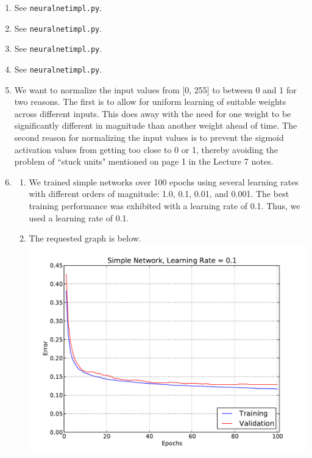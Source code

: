 \documentclass[solution, letterpaper]{cs121}
\begin{document}
\begin{enumerate}
	\item See {\tt neural\textunderscore net\textunderscore impl.py}.
	\item See {\tt neural\textunderscore net\textunderscore impl.py}.
	\item See {\tt neural\textunderscore net\textunderscore impl.py}.
	\item See {\tt neural\textunderscore net\textunderscore impl.py}.
	\item We want to normalize the input values from [0, 255] to between 0 and 1 for two reasons. The first is to allow for uniform learning of suitable weights across different inputs. This does away with the need for one weight to be significantly different in magnitude than another weight ahead of time. The second reason for normalizing the input values is to prevent the sigmoid activation values from getting too close to 0 or 1, thereby avoiding the problem of ``stuck units" mentioned on page 1 in the Lecture 7 notes.
	\item
		\begin{enumerate}
		\item We trained simple networks over 100 epochs using several learning rates with different orders of magnitude: 1.0, 0.1, 0.01, and 0.001. The best training performance was exhibited with a learning rate of 0.1. Thus, we used a learning rate of 0.1.
		\item The requested graph is below. \\
		\includegraphics[scale=0.8]{Simple-Network-Alpha-0_1.pdf}
			\begin{enumerate}

\end{enumerate}
\end{enumerate}
\end{enumerate}
\end{document}
